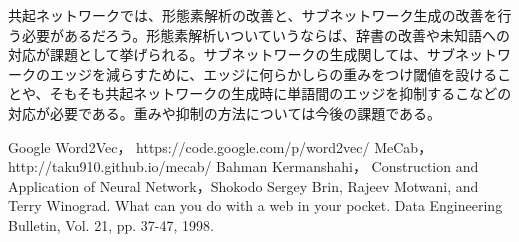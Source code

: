 \documentclass{../style/sig-alternate}
\begin{document}
共起ネットワークでは、形態素解析の改善と、サブネットワーク生成の改善を行う必要があるだろう。形態素解析いついていうならば、辞書の改善や未知語への対応が課題として挙げられる。サブネットワークの生成関しては、サブネットワークのエッジを減らすために、エッジに何らかしらの重みをつけ閾値を設けることや、そもそも共起ネットワークの生成時に単語間のエッジを抑制するこなどの対応が必要である。重みや抑制の方法については今後の課題である。

\begin{thebibliography}{99}

 Google Word2Vec， https://code.google.com/p/word2vec/
 MeCab， http://taku910.github.io/mecab/
 Bahman Kermanshahi， Construction and Application of Neural Network，Shokodo
 Sergey Brin, Rajeev Motwani, and Terry Winograd. What can you do with a
web in your pocket. Data Engineering Bulletin, Vol. 21, pp. 37-47, 1998.

\end{thebibliography}
\end{document}
